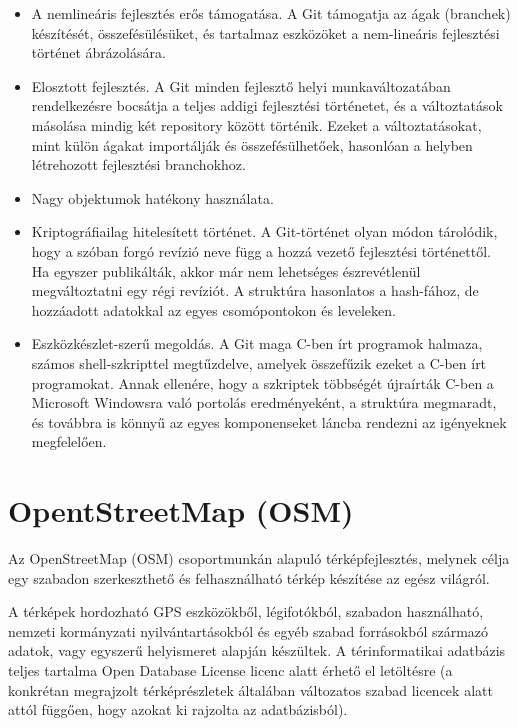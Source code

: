 \documentclass[a4paper,12pt]{report}
\begin{document}
\begin{itemize}
\item A nemlineáris fejlesztés erős támogatása. A Git támogatja az ágak (branchek) készítését, összefésülésüket, és tartalmaz eszközöket a nem-lineáris fejlesztési történet ábrázolására.
\item Elosztott fejlesztés. A Git minden fejlesztő helyi munkaváltozatában rendelkezésre bocsátja a teljes addigi fejlesztési történetet, és a változtatások másolása mindig két repository között történik. Ezeket a változtatásokat, mint külön ágakat importálják és összefésülhetőek, hasonlóan a helyben létrehozott fejlesztési branchokhoz.
\item Nagy objektumok hatékony használata.
\item Kriptográfiailag hitelesített történet. A Git-történet olyan módon tárolódik, hogy a szóban forgó revízió neve függ a hozzá vezető fejlesztési történettől. Ha egyszer publikálták, akkor már nem lehetséges észrevétlenül megváltoztatni egy régi revíziót. A struktúra hasonlatos a hash-fához, de hozzáadott adatokkal az egyes csomópontokon és leveleken.
\item Eszközkészlet-szerű megoldás. A Git maga C-ben írt programok halmaza, számos shell-szkripttel megtűzdelve, amelyek összefűzik ezeket a C-ben írt programokat. Annak ellenére, hogy a szkriptek többségét újraírták C-ben a Microsoft Windowsra való portolás eredményeként, a struktúra megmaradt, és továbbra is könnyű az egyes komponenseket láncba rendezni az igényeknek megfelelően.
\end{itemize}



\section{OpentStreetMap (OSM)}
\label{osm}

Az OpenStreetMap (OSM) csoportmunkán alapuló térképfejlesztés, melynek célja egy szabadon szerkeszthető és felhasználható térkép készítése az egész világról.

\vspace{2mm}
A térképek hordozható GPS eszközökből, légifotókból, szabadon használható, nemzeti kormányzati nyilvántartásokból és egyéb szabad forrásokból származó adatok, vagy egyszerű helyismeret alapján készültek. A térinformatikai adatbázis teljes tartalma Open Database License licenc alatt érhető el letöltésre \cite{odbl} (a konkrétan megrajzolt térképrészletek általában változatos szabad licencek alatt attól függően, hogy azokat ki rajzolta az adatbázisból).
\end{document}

